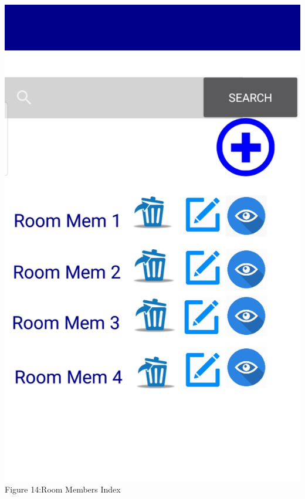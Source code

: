 \documentclass{article}
\begin{document}
\begin{center}
\includegraphics[scale=0.20]{f9}
\\Figure 14:Room Members Index
\end{center}
\end{document}

